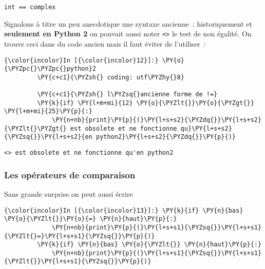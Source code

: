     \begin{Verbatim}[commandchars=\\\{\},frame=single,framerule=0.3mm,rulecolor=\color{cellframecolor}]
int == complex
\end{Verbatim}

    Signalons à titre un peu anecdotique une syntaxe ancienne~:
historiquement et \textbf{seulement en Python 2} on pouvait aussi noter
\texttt{\textless{}\textgreater{}} le test de non égalité. On trouve
ceci dans du code ancien mais il faut éviter de l'utiliser~:

    \begin{Verbatim}[commandchars=\\\{\},frame=single,framerule=0.3mm,rulecolor=\color{cellframecolor}]
{\color{incolor}In [{\color{incolor}12}]:} \PY{o}{\PYZpc{}\PYZpc{}python}2
         \PY{c+c1}{\PYZsh{} coding: utf\PYZhy{}8}
         
         \PY{c+c1}{\PYZsh{} l\PYZsq{}ancienne forme de !=}
         \PY{k}{if} \PY{l+m+mi}{12} \PY{o}{\PYZlt{}}\PY{o}{\PYZgt{}} \PY{l+m+mi}{25}\PY{p}{:}
             \PY{n+nb}{print}\PY{p}{(}\PY{l+s+s2}{\PYZdq{}}\PY{l+s+s2}{\PYZlt{}\PYZgt{} est obsolete et ne fonctionne qu}\PY{l+s+s2}{\PYZsq{}}\PY{l+s+s2}{en python2}\PY{l+s+s2}{\PYZdq{}}\PY{p}{)}
\end{Verbatim}


    \begin{Verbatim}[commandchars=\\\{\},frame=single,framerule=0.3mm,rulecolor=\color{cellframecolor}]
<> est obsolete et ne fonctionne qu'en python2
\end{Verbatim}

    \hypertarget{les-opuxe9rateurs-de-comparaison}{%
\subsubsection{Les opérateurs de
comparaison}\label{les-opuxe9rateurs-de-comparaison}}

    Sans grande surprise on peut aussi écrire

    \begin{Verbatim}[commandchars=\\\{\},frame=single,framerule=0.3mm,rulecolor=\color{cellframecolor}]
{\color{incolor}In [{\color{incolor}13}]:} \PY{k}{if} \PY{n}{bas} \PY{o}{\PYZlt{}}\PY{o}{=} \PY{n}{haut}\PY{p}{:}
             \PY{n+nb}{print}\PY{p}{(}\PY{l+s+s1}{\PYZsq{}}\PY{l+s+s1}{\PYZlt{}=}\PY{l+s+s1}{\PYZsq{}}\PY{p}{)}
         \PY{k}{if} \PY{n}{bas} \PY{o}{\PYZlt{}} \PY{n}{haut}\PY{p}{:}
             \PY{n+nb}{print}\PY{p}{(}\PY{l+s+s1}{\PYZsq{}}\PY{l+s+s1}{\PYZlt{}}\PY{l+s+s1}{\PYZsq{}}\PY{p}{)}
\end{Verbatim}


